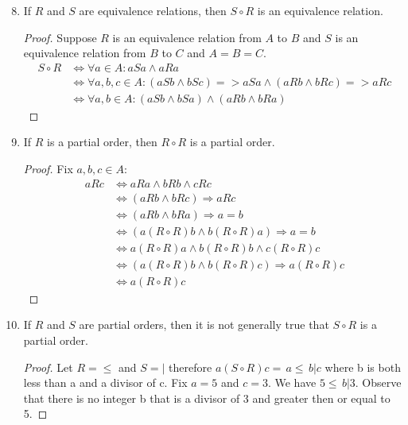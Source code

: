 \documentclass{article}
\begin{document}
  \begin{enumerate} \setcounter{enumi}{7}
    \item If $R$ and $S$ are equivalence relations, then $S \circ R$ is an equivalence relation.
      \begin{proof}
        Suppose $R$ is an equivalence relation from $A$ to $B$ and $S$ is an equivalence relation from $B$ to $C$ and $A = B = C$.
        \begin{align*}
          S \circ R &\iff \forall a\in A : aSa \wedge aRa \\
          &\iff \forall a,b,c\in A: (aSb \wedge bSc) => aSa \wedge (aRb \wedge bRc) => aRc \\
            &\iff \forall a,b\in A: (aSb \wedge bSa) \wedge (aRb \wedge bRa) 
        \end{align*}
      \end{proof}
    \item If $R$ is a partial order, then $R \circ R$ is a partial order.
      \begin{proof}
        Fix $a,b,c\in A$:
        \begin{align*}
          aRc &\iff aRa \wedge bRb \wedge cRc \\
            &\iff (aRb \wedge bRc) \Rightarrow aRc \\
            &\iff (aRb \wedge bRa) \Rightarrow a = b \\
            &\iff (a(R \circ R)b \wedge b(R \circ R)a) \Rightarrow a = b \\
            &\iff a(R \circ R)a \wedge b(R \circ R)b \wedge c(R \circ R)c \\
            &\iff (a(R \circ R)b \wedge b(R \circ R)c) \Rightarrow a(R \circ R)c \\ 
            &\iff a(R \circ R)c
        \end{align*}
      \end{proof}
    \item If $R$ and $S$ are partial orders, then it is not generally true that $S \circ R$ is a partial order.
      \begin{proof}
        Let $R = \le$ and $S = |$ therefore $a(S \circ R)c =\, a\le\, b | c$ where b is both less than a and a divisor of c. Fix $a = 5$ and $c = 3$. We have $5\le\, b|3$. Observe that there is no integer b that is a divisor of 3 and greater then or equal to 5. 
      \end{proof}
  \end{enumerate}
\end{document}
